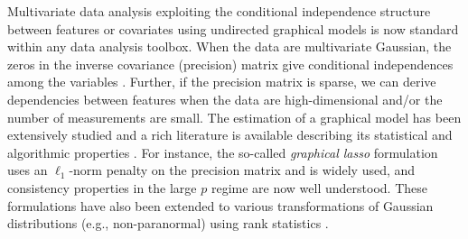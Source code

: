 Multivariate data analysis exploiting the conditional independence structure between features or covariates using 
undirected graphical models is now standard within any data analysis toolbox. 
When the data are multivariate Gaussian, the zeros in the inverse covariance (precision) matrix give conditional independences 
among the variables \cite{lauritzen1996graphical}. Further, if the precision matrix is sparse, we can  
derive dependencies between features when the data are high-dimensional and/or the number of measurements are small. 
The estimation of a graphical model
has been extensively studied
and a rich literature is available describing 
its statistical and algorithmic properties \cite{koller2009probabilistic,jordan1998learning}. 
For instance, the so-called \textit{graphical lasso} formulation uses an $\ell_1$-norm penalty on the 
precision matrix and is widely used, and consistency properties 
in the large $p$ regime \cite{cai2011constrained,friedman2008sparse,yuan2010high} are now well understood. 
These formulations have also been extended to various transformations of Gaussian distributions (e.g., non-paranormal)
using rank statistics \cite{liu2009nonparanormal,xue2012regularized,liu2012high}.

